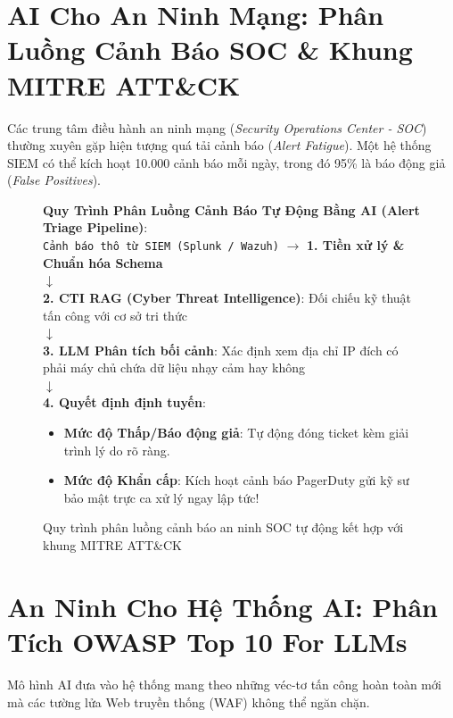 \section{AI Cho An Ninh Mạng: Phân Luồng Cảnh Báo SOC \& Khung MITRE ATT\&CK}
\label{sec:sec-soc-triage}

Các trung tâm điều hành an ninh mạng (\textit{Security Operations Center - SOC}) thường xuyên gặp hiện tượng quá tải cảnh báo (\textit{Alert Fatigue}). Một hệ thống SIEM có thể kích hoạt 10.000 cảnh báo mỗi ngày, trong đó 95\% là báo động giả (\textit{False Positives}).

\begin{figure}[htbp]
\centering
\begin{tcolorbox}[colback=boxbg,colframe=primarycolor,width=0.95\textwidth,arc=2pt]
\small
\textbf{Quy Trình Phân Luồng Cảnh Báo Tự Động Bằng AI (Alert Triage Pipeline)}:\\[0.2cm]
\texttt{Cảnh báo thô từ SIEM (Splunk / Wazuh)} $\longrightarrow$ \textbf{1. Tiền xử lý \& Chuẩn hóa Schema}\\
$\downarrow$\\
\textbf{2. CTI RAG (Cyber Threat Intelligence)}: Đối chiếu kỹ thuật tấn công với cơ sở tri thức \\
$\downarrow$\\
\textbf{3. LLM Phân tích bối cảnh}: Xác định xem địa chỉ IP đích có phải máy chủ chứa dữ liệu nhạy cảm hay không\\
$\downarrow$\\
\textbf{4. Quyết định định tuyến}:
\begin{itemize}
  \item \textbf{Mức độ Thấp/Báo động giả}: Tự động đóng ticket kèm giải trình lý do rõ ràng.
  \item \textbf{Mức độ Khẩn cấp}: Kích hoạt cảnh báo PagerDuty gửi kỹ sư bảo mật trực ca xử lý ngay lập tức!
\end{itemize}
\end{tcolorbox}
\caption{Quy trình phân luồng cảnh báo an ninh SOC tự động kết hợp với khung MITRE ATT\&CK}
\label{fig:soc-triage-pipeline}
\end{figure}

\section{An Ninh Cho Hệ Thống AI: Phân Tích OWASP Top 10 For LLMs}
\label{sec:sec-owasp-llm}

Mô hình AI đưa vào hệ thống mang theo những véc-tơ tấn công hoàn toàn mới mà các tường lửa Web truyền thống (WAF) không thể ngăn chặn.

